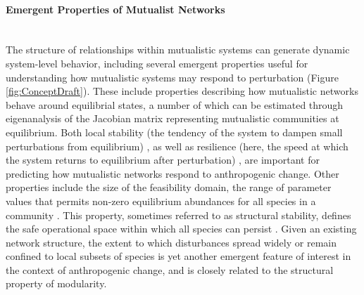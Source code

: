 \paragraph*{Emergent Properties of Mutualist Networks}\mbox{}\\ 
The structure of relationships within mutualistic systems can generate dynamic system-level behavior, including several emergent properties useful for understanding how mutualistic systems may respond to perturbation (Figure \ref{fig:ConceptDraft}). These include properties describing how mutualistic networks behave around equilibrial states, a number of which can be estimated through eigenanalysis of the Jacobian matrix representing mutualistic communities at equilibrium. Both local stability (the tendency of the system to dampen small perturbations from equilibrium) \parencite{valdovinos2019mutualistic, okuyama2008network}, as well as resilience (here, the speed at which the system returns to equilibrium after perturbation) \parencite{thebault2010stability, suweis2013emergence}, are important for predicting how mutualistic networks respond to anthropogenic change. Other properties include the size of the feasibility domain, the range of parameter values that permits non-zero equilibrium abundances for all species in a community \parencite{saavedra2016nested, grilli2017feasibility, wang2023interspecific}. This property, sometimes referred to as structural stability, defines the safe operational space within which all species can persist \parencite{bascompte2022resilience}. Given an existing network structure, the extent to which disturbances spread widely or remain confined to local subsets of species \parencite{martins2024propagation, suweis2015effect} is yet another emergent feature of interest in the context of anthropogenic change, and is closely related to the structural property of modularity. 


